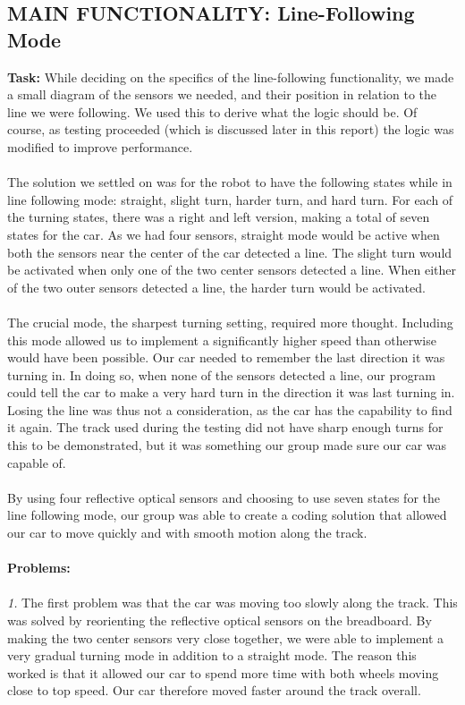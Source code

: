 \documentclass[paper=a4, fontsize=11pt]{scrartcl}
\numberwithin{equation}{section}		%
\numberwithin{figure}{section}			%
\numberwithin{table}{section}				%
\begin{document}
{\subsection{MAIN FUNCTIONALITY: Line-Following Mode}
\textbf{Task: }While deciding on the specifics of the line-following functionality, we made a small diagram of the sensors we needed, and their position in relation to the line we were following. We used this to derive what the logic should be. Of course, as testing proceeded (which is discussed later in this report) the logic was modified to improve performance.
\\\\
The solution we settled on was for the robot to have the following states while in line following mode: straight, slight turn, harder turn, and hard turn. For each of the turning states, there was a right and left version, making a total of seven states for the car. As we had four sensors, straight mode would be active when both the sensors near the center of the car detected a line. The slight turn would be activated when only one of the two center sensors detected a line. When either of the two outer sensors detected a line, the harder turn would be activated.
\\\\
The crucial mode, the sharpest turning setting, required more thought. Including this mode allowed us to implement a significantly higher speed than otherwise would have been possible. Our car needed to remember the last direction it was turning in. In doing so, when none of the sensors detected a line, our program could tell the car to make a very hard turn in the direction it was last turning in. Losing the line was thus not a consideration, as the car has the capability to find it again. The track used during the testing did not have sharp enough turns for this to be demonstrated, but it was something our group made sure our car was capable of.
\\\\
By using four reflective optical sensors and choosing to use seven states for the line following mode, our group was able to create a coding solution that allowed our car to move quickly and with smooth motion along the track.
\\\\
\textbf{Problems: }\\\\
\textit{1. }The first problem was that the car was moving too slowly along the track. This was solved by reorienting the reflective optical sensors on the breadboard. By making the two center sensors very close together, we were able to implement a very gradual turning mode in addition to a straight mode. The reason this worked is that it allowed our car to spend more time with both wheels moving close to top speed. Our car therefore moved faster around the track overall.
}
\end{document}

